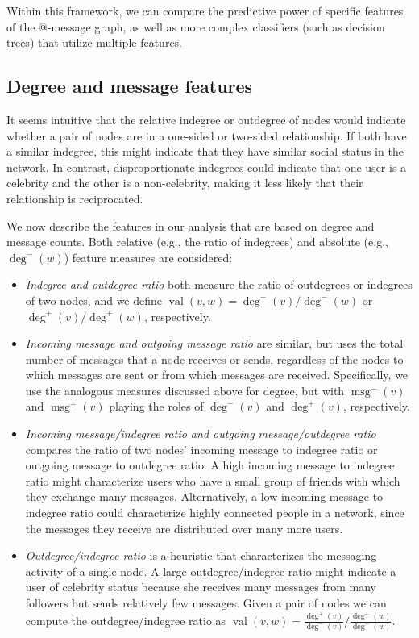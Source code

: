 \documentclass[conference]{IEEEtran}
\begin{document}
Within this framework, we can compare the predictive power of specific features of the @-message graph, as well as more complex classifiers (such as decision trees) that utilize multiple features.

\subsection{Degree and message features}
It seems intuitive that the relative indegree or outdegree of nodes would indicate whether a pair of nodes are in a one-sided or two-sided relationship. 
If both have a similar indegree, this might indicate that they have similar social status in the network. 
In contrast, disproportionate indegrees could indicate that one user is a celebrity and the other is a non-celebrity, making it less likely that their relationship is reciprocated.

We now describe the features 
in our analysis that are based on degree and message counts.  
Both relative (e.g., the ratio of indegrees) and absolute (e.g., $\deg^-(w)$) feature measures are considered:

\begin{itemize}
\item \emph{Indegree and outdegree ratio} both measure the ratio of outdegrees or indegrees of two nodes, and we define $\operatorname{val}(v,w) = \deg^-(v)/\deg^-(w)$ or $\deg^+(v)/\deg^+(w)$, respectively.

\item \emph{Incoming message and outgoing message ratio} are similar,
but uses the total number of messages that a node receives or
sends, regardless of the nodes to which messages are sent or from which messages are received.
Specifically, we use the analogous measures
discussed above for degree, but with 
$\operatorname{msg}^-(v)$ and $\operatorname{msg}^+(v)$ playing
the roles of $\deg^-(v)$ and $\deg^+(v)$, respectively.

\item \emph{Incoming message/indegree ratio and outgoing message/outdegree ratio} compares the ratio of two nodes' incoming message to indegree ratio or outgoing message to outdegree ratio. 
A high incoming message to indegree ratio might characterize users who have a small group of friends with which they exchange many messages.
Alternatively, a low incoming message to indegree ratio could characterize highly connected 
people in a network, since the messages they receive are distributed over many more users.

\item \emph{Outdegree/indegree ratio} is a heuristic that characterizes the messaging activity of a single node.  
A large outdegree/indegree ratio might indicate a user of celebrity status because she receives many messages from many followers  
but sends relatively few messages. 
Given a pair of nodes we can compute the outdegree/indegree ratio as $\operatorname{val}(v,w) = \frac{\deg^+(v)}{\deg^-(v)} / \frac{\deg^+(w)}{\deg^-(w)}$.
\end{itemize}
\end{document}
